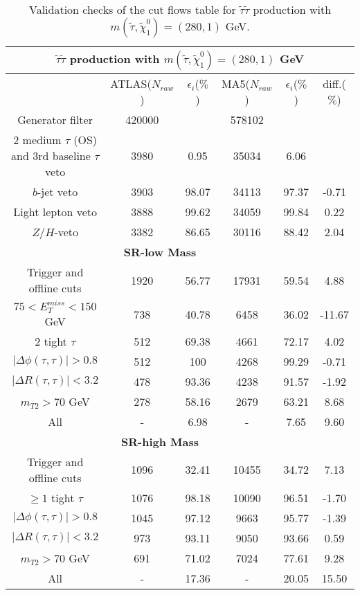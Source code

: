 \documentclass[12pt,A4paper,pdftex, ]{article}
\begin{document}
\begin{table}[h!]
\begin{center}
\begin{tabular}{|c|c|c|c|c|c|}
\hline
\multicolumn{6}{|c|}{ \textbf{$ \tilde{\tau}\tilde{\tau} $ production with $ m(\tilde{\tau},\tilde{\chi}^0_1) = (280,1) $ GeV} }\\
\hline\hline
 & ATLAS($N_{raw}$) & $\epsilon_i$($\%$) & MA5($N_{raw}$) & $\epsilon_i$($\%$) & diff.($\%$) \\
\hline\hline
Generator filter & 420000 & & 578102 & & \\ \hline
2 medium $\tau$ (OS) and 3rd baseline $\tau$ veto & 3980 & 0.95 & 35034 & 6.06 & \\ \hline
$b$-jet veto & 3903 & 98.07 & 34113 & 97.37 & -0.71 \\ \hline
Light lepton veto & 3888 & 99.62 & 34059 & 99.84 & 0.22 \\ \hline
$Z/H$-veto & 3382 & 86.65 & 30116 & 88.42 & 2.04 \\ \hline
\multicolumn{5}{|c|}{ \textbf{SR-low Mass} }\\\hline
Trigger and offline cuts & 1920 & 56.77 & 17931 & 59.54 & 4.88 \\ \hline
$ 75 < E^{miss}_T < 150 $ GeV & 738 & 40.78 & 6458 & 36.02 & -11.67 \\ \hline
2 tight $\tau$ & 512 & 69.38 & 4661 & 72.17 & 4.02 \\ \hline
$ |\Delta\phi(\tau,\tau)| > 0.8 $ & 512 & 100 & 4268 & 99.29 & -0.71 \\ \hline
$ |\Delta R(\tau,\tau)| < 3.2 $ & 478 & 93.36 & 4238 & 91.57 & -1.92 \\ \hline
$ m_{T2} > 70 $ GeV & 278 & 58.16 & 2679 & 63.21 & 8.68 \\ \hline
All & - & 6.98 & - & 7.65 & 9.60 \\ \hline
\hline
\multicolumn{5}{|c|}{ \textbf{SR-high Mass} }\\\hline
Trigger and offline cuts & 1096 & 32.41 & 10455 & 34.72 & 7.13 \\ \hline
$ \geq 1 $ tight $\tau$ & 1076 & 98.18 & 10090 & 96.51 & -1.70 \\ \hline
$ |\Delta\phi(\tau,\tau)| > 0.8 $ & 1045 & 97.12 & 9663 & 95.77 & -1.39 \\ \hline
$ |\Delta R(\tau,\tau)| < 3.2 $ & 973 & 93.11 & 9050 & 93.66 & 0.59 \\ \hline
$ m_{T2} > 70 $ GeV & 691 & 71.02 & 7024 & 77.61 & 9.28 \\ \hline
All & - & 17.36 & - & 20.05 & 15.50 \\ \hline
\end{tabular}
\end{center}
\caption{Validation checks of the cut flows table for $ \tilde{\tau}\tilde{\tau} $ production with $ m(\tilde{\tau},\tilde{\chi}^0_1) = (280,1) $ GeV.}
\label{280GeV}
\end{table} 
\end{document}
